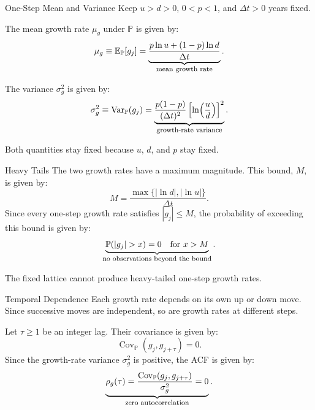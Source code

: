 \documentclass[aspectratio=169,11pt]{beamer}
\newcommand{\Pmeasure}{\mathbb{P}}
\begin{document}
\begin{frame}{One-Step Mean and Variance}
  Keep $u>d>0$, $0<p<1$, and $\Delta t>0$ years fixed.

  The mean growth rate $\mu_g$ under $\Pmeasure$ is given by:
  \[
    \mu_g\equiv\mathbb E_{\Pmeasure}[g_j]
    =\underbrace{\frac{p\ln u+(1-p)\ln d}{\Delta t}}_{\text{\footnotesize mean growth rate}}.
  \]

  The variance $\sigma_g^2$ is given by:
  \[
    \sigma_g^2\equiv\operatorname{Var}_{\Pmeasure}(g_j)
    =\underbrace{\frac{p(1-p)}{(\Delta t)^2}
      \left[\ln\!\left(\frac ud\right)\right]^2}_{\text{\footnotesize growth-rate variance}}.
  \]

  Both quantities stay fixed because $u$, $d$, and $p$ stay fixed.
\end{frame}



\begin{frame}{Heavy Tails}
  The two growth rates have a maximum magnitude.
  This bound, $M$, is given by:
  \[
    M=\frac{\max\{|\ln d|,|\ln u|\}}{\Delta t}.
  \]
  Since every one-step growth rate satisfies $|g_j|\leq M$,
  the probability of exceeding this bound is given by:
  \[
    \underbrace{\Pmeasure(|g_j|>x)=0\quad\text{for }x>M}_{\text{\footnotesize no observations beyond the bound}}.
  \]

  \vspace{0.6em}
  The fixed lattice cannot produce heavy-tailed one-step growth rates.
\end{frame}

\begin{frame}{Temporal Dependence}
  Each growth rate depends on its own up or down move.
  Since successive moves are independent, so are growth rates at
  different steps.

  Let $\tau\geq1$ be an integer lag. Their covariance is given by:
  \[
    \operatorname{Cov}_{\Pmeasure}(g_j,g_{j+\tau})=0.
  \]
  Since the growth-rate variance $\sigma_g^2$ is positive, the ACF is given by:
  \[
    \underbrace{\rho_g(\tau)=
      \frac{\operatorname{Cov}_{\Pmeasure}(g_j,g_{j+\tau})}{\sigma_g^2}
      =0}_{\text{\footnotesize zero autocorrelation}}.
  \]

\end{frame}
\end{document}
